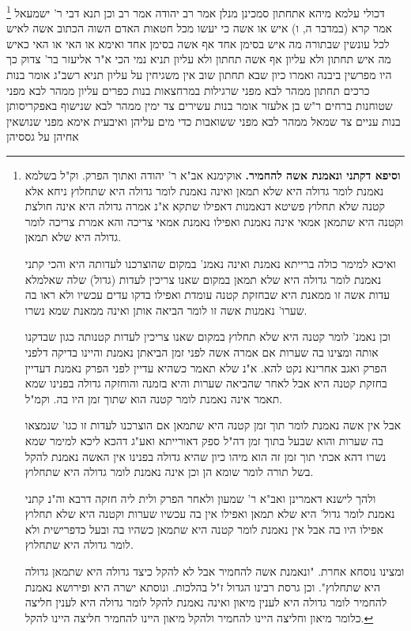 \documentclass[12pt, openany]{book}
\newcommand{\footnotecomment}[1]{
	\renewcommand\thefootnote{}
	\footnote{#1}}
\newcommand{\commenta}[1]{\footnotecomment{#1}}
\begin{document}
{\commenta{\textbf{וסיפא דקתני ונאמנת אשה להחמיר.} אוקימנא אב"א ר' יהודה ואתוך הפרק. וק"ל בשלמא נאמנת לומר גדולה היא שלא תמאן ואינה נאמנת לומר גדולה היא שתחלוץ ניחא אלא קטנה שלא תחלוץ פשיטא דנאמנות דאפילו שתקא א"נ אמרה גדולה היא אינה חולצת וקטנה היא שתמאן אמאי אינה נאמנת ואפילו נאמנת אמאי צריכה והא אמרת צריכה לומר גדולה היא שלא תמאן.\par ואיכא למימר כולה ברייתא נאמנת ואינה נאמנ' במקום שהוצרכנו לעדותה היא והכי קתני נאמנת לומר גדולה היא שלא תמאן במקום שאנו צריכין לעדות (גדול) שלה שאלמלא עדות אשה זו ממאנת היא שבחזקת קטנה עומדת ואפילו בדקו עדים עכשיו ולא ראו בה שערו' נאמנות אשה זו לומר הביאה אותן ואינה ממאנת שמא נשרו.\par וכן נאמנ' לומר קטנה היא שלא תחלוץ במקום שאנו צריכין לעדות קטנותה כגון שבדקנו אותה ומצינו בה שערות אם אמרה אשה לפני זמן הביאתן נאמנת והיינו בדיקה דלפני הפרק ואגב אחרינא נקט להא. א"נ שלא תאמר כשהיא עדיין לפני הפרק נאמנת דעדיין בחזקת קטנה היא אבל לאחר שהביאה שערות והיא בזמנה והוחזקה גדולה בפנינו שמא תאמר אינה נאמנת לומר קטנה הוא שתוך זמן היו בה. וקמ"ל.\par אבל אין אשה נאמנת לומר תוך זמן קטנה היא שתמאן אם הוצרכנו לעדות זו כגו' שנמצאו בה שערות והוא שבעל בתוך זמן דה"ל ספק דאורייתא ואע"ג דהכא ליכא למימר שמא נשרו דהא אכתי תוך זמן זה הוא מיהו כיון שהיא גדולה בפנינו אין האשה נאמנת להקל בשל תורה לומר שומא הן וכן אינה נאמנת לומר גדולה היא שתחלוץ.\par ולהך לישנא דאמרינן ואב"א ר' שמעון ולאחר הפרק ולית ליה חזקה דרבא וה"נ קתני נאמנת לומר גדול' היא שלא תמאן ואפילו אין בה עכשיו שערות וקטנה היא שלא תחלוץ אפילו היו בה אבל אין נאמנת לומר קטנה היא שתמאן כשהיו בה ובעל כדפרישית ולא לומר גדולה היא שתחלוץ.\par ומצינו נוסחא אחרת. "ונאמנת אשה להחמיר אבל לא להקל כיצד גדולה היא שתמאן גדולה היא שתחלוץ". וכן גרסת רבינו הגדול ז"ל בהלכות. ונוסתא ישרה היא ופירושא נאמנת להחמיר לומר גדולה היא לענין מיאון ואינה נאמנת להקל לומר גדולה היא לענין חליצה כלומר מיאון וחליצה היינו להחמיר ולהקל מיאון היינו להחמיר חליצה היינו להקל. }
דכולי עלמא מיהא אתחתון סמכינן מנלן אמר רב יהודה אמר רב וכן תנא דבי ר' ישמעאל אמר קרא (במדבר ה, ו) איש או אשה כי יעשו מכל חטאות האדם השוה הכתוב אשה לאיש לכל עונשין שבתורה מה איש בסימן אחד אף אשה בסימן אחד 
ואימא או האי או האי כאיש מה איש תחתון ולא עליון אף אשה תחתון ולא עליון 
תניא נמי הכי א"ר אליעזר בר' צדוק כך היו מפרשין ביבנה ואמרו כיון שבא תחתון שוב אין משגיחין על עליון 
תניא רשב"ג אומר בנות כרכים תחתון ממהר לבא מפני שרגילות במרחצאות בנות כפרים עליון ממהר לבא מפני שטוחנות ברחים 
ר"ש בן אלעזר אומר בנות עשירים צד ימין ממהר לבא שנישוף באפקריסותן בנות עניים צד שמאל ממהר לבא מפני ששואבות כדי מים עליהן ואיבעית אימא מפני שנושאין אחיהן על גססיהן 
}
\end{document}
